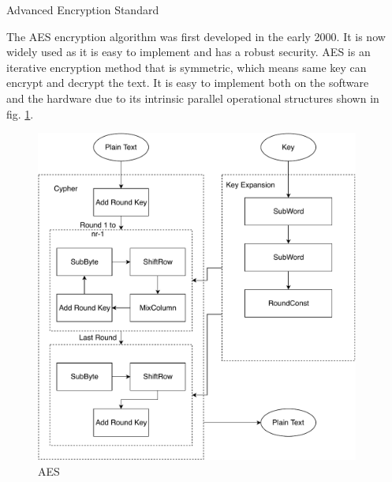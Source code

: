 \documentclass[final]{beamer}
\newlength{\sepwid}
\newlength{\onecolwid}
\begin{document}
\begin{frame}[t]
\begin{columns}[t]
\begin{column}{\onecolwid}
\begin{block}{Advanced Encryption Standard}

The AES\cite{daemen2013design} encryption algorithm was first developed in the early 2000. It is now widely used as it is easy to implement and has a robust security. AES is an iterative  encryption method that is symmetric, which means same key can encrypt and decrypt the text.
It is easy to implement both on the software and the hardware due to its intrinsic parallel operational structures shown in fig. \ref{fig:aes}. 

\end{block}


\begin{figure}
\includegraphics[width=1\linewidth]{poster/AES_paper.pdf}
\caption{AES}
\label{fig:aes}
\end{figure}


\end{column} %

\begin{column}{\sepwid}\end{column} %


\end{columns}
\end{frame}
\end{document}

